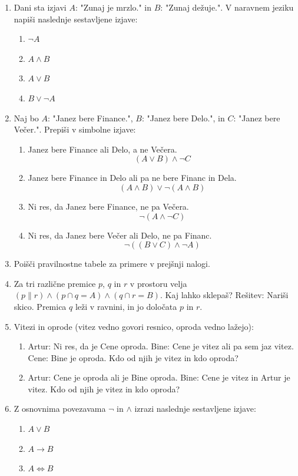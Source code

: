 \documentclass[11pt,paper=b5,footinclude,headinclude]{scrbook} %
\begin{document}
\begin{enumerate}
\item Dani sta izjavi $A$: "Zunaj je mrzlo." in $B$: "Zunaj dežuje.". V naravnem jeziku napiši naslednje sestavljene izjave:
\begin{enumerate}
  \item $\neg A$
  \item $A \land B$
  \item $A \lor B$
  \item $B \lor \neg A$
\end{enumerate}

\item Naj bo $A$: "Janez bere Finance.", $B$: "Janez bere Delo.", in $C$: "Janez bere Večer.".
Prepiši v simbolne izjave:
\begin{enumerate}
  \item Janez bere Finance ali Delo, a ne Večera. \[(A \lor B) \land \neg C\]
  \item Janez bere Finance in Delo ali pa ne bere Financ in Dela. \[(A \land B) \lor \neg (A \land B)\]
  \item Ni res, da Janez bere Finance, ne pa Večera. \[\neg (A \land \neg C)\]
  \item Ni res, da Janez bere Večer ali Delo, ne pa Financ. \[\neg ((B \lor C) \land \neg A)\]
\end{enumerate}

\item Poišči pravilnostne tabele za primere v prejšnji nalogi.

\item Za tri različne premice $p$, $q$ in $r$ v prostoru velja $(p \parallel r) \land (p \cap q = A) \land (q \cap r = B)$. Kaj lahko sklepaš? Rešitev: Nariši skico. Premica $q$ leži v ravnini, in jo določata $p$ in $r$.

\item Vitezi in oprode (vitez vedno govori resnico, oproda vedno lažejo):
\begin{enumerate}
  \item Artur: Ni res, da je Cene oproda.
  Bine: Cene je vitez ali pa sem jaz vitez.
  Cene: Bine je oproda.
  Kdo od njih je vitez in kdo oproda?
  \item Artur: Cene je oproda ali je Bine oproda.
  Bine: Cene je vitez in Artur je vitez.
  Kdo od njih je vitez in kdo oproda?
\end{enumerate}

\item Z osnovnima povezavama $\neg$ in $\land$ izrazi naslednje sestavljene izjave:
\begin{enumerate}
  \item $A \lor B$
  \item $A \rightarrow B$
  \item $A \iff B$
\end{enumerate}


\end{enumerate}
\end{document}
